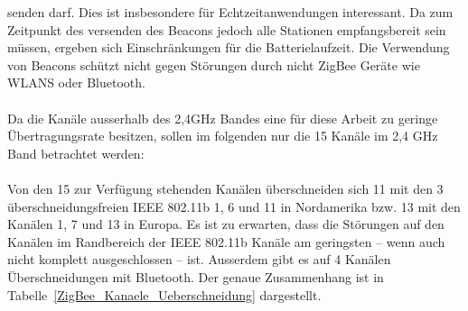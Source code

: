                 senden darf. Dies ist insbesondere für Echtzeitanwendungen interessant. Da zum Zeitpunkt des
                versenden des Beacons jedoch alle Stationen empfangsbereit sein müssen, ergeben sich 
                Einschränkungen für die Batterielaufzeit. Die Verwendung von Beacons schützt nicht gegen
                Störungen durch nicht ZigBee Geräte wie WLANS oder Bluetooth.\\
                \\
                Da die Kanäle ausserhalb des 2,4GHz Bandes eine für diese Arbeit zu geringe Übertragungsrate
                besitzen, sollen im folgenden nur die 15 Kanäle im 2,4 GHz Band betrachtet werden:\\
                \\
                Von den 15 zur Verfügung stehenden Kanälen überschneiden sich 11 mit den 3 überschneidungsfreien 
                IEEE 802.11b 1, 6 und 11 in Nordamerika bzw. 13 mit den Kanälen 1, 7 und 13 in Europa. Es ist zu 
                erwarten, dass die Störungen auf den Kanälen im Randbereich der IEEE 802.11b Kanäle am geringsten --
                wenn auch nicht komplett ausgeschlossen -- ist.
                Ausserdem gibt es auf 4 Kanälen Überschneidungen mit Bluetooth. Der genaue Zusammenhang ist
                in Tabelle~\ref{ZigBee_Kanaele_Ueberschneidung} dargestellt.

